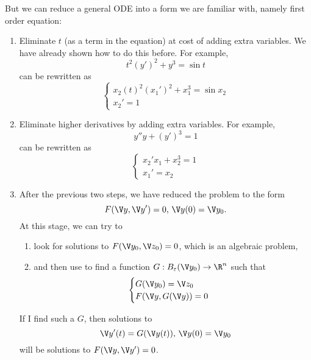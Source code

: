 \documentclass[a4paper]{article}
\theoremstyle{definition}
\begin{document}
But we can reduce a general ODE into a form we are familiar with, namely first order equation:
\begin{enumerate}
\item Eliminate \(t\) (as a term in the equation) at cost of adding extra variables. We have already shown how to do this before. For example,
  \[
    t^2(y')^2 + y^3 = \sin t
  \]
  can be rewritten as
  \[
    \begin{cases}
      x_2(t)^2(x_1')^2 + x_1^3 = \sin x_2 \\
      x_2' = 1
    \end{cases}
  \]
\item Eliminate higher derivatives by adding extra variables. For example,
  \[
    y''y+ (y')^3 = 1
  \]
  can be rewritten as
  \[
    \begin{cases}
      x_2'x_1 + x_2^3 = 1 \\
      x_1' = x_2
    \end{cases}
  \]
\item After the previous two steps, we have reduced the problem to the form
  \[
    F(\V y, \V y') = 0, \, \V y(0) = \V y_0.
  \]
  At this stage, we can try to
  \begin{enumerate}
  \item look for solutions to \(F(\V y_0, \V z_0) = 0\), which is an algebraic problem,
  \item and then use  to find a function \(G: B_\varepsilon(\V y_0) \to \R^n\) such that
    \[
     \begin{cases} 
       G(\V y_0) = \V z_0 \\
       F(\V y, G(\V y)) = 0
    \end{cases}
    \]
  \end{enumerate}
  If I find such a \(G\), then solutions to
  \[
    \V y'(t) = G(\V y(t)), \, \V y(0) = \V y_0
  \]
  will be solutions to \(F(\V y, \V y') = 0\).
\end{enumerate}

\printindex
\end{document}
